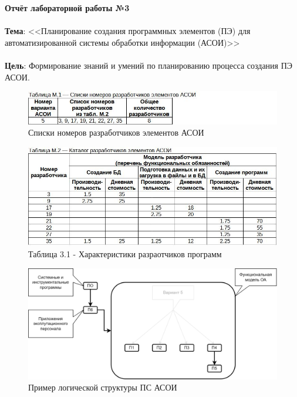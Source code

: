 \documentclass[12pt, a4paper, simple]{eskdtext}
\def \gpiDocNum {3}
\def \gpiTopicRep {Планирование создания программных элементов (ПЭ) для
автоматизированной системы обработки информации (АСОИ)}
\def \gpiDocTopic {Отчёт лабораторной работы №\gpiDocNum}
\begin{document}
    
    \thispagestyle{plain}
    \pagestyle{plain}

    \begin{center}
        \textbf{\gpiDocTopic}
    \end{center}

    \paragraph{} \textbf{Тема}: <<\gpiTopicRep>>

    \paragraph{} \textbf{Цель}:
    Формирование знаний и умений по планированию процесса создания ПЭ АСОИ.

    \begin{figure}[ph!]
        \centering
        \includegraphics[]
            {_docs/ТаблицаМ1СпискиНомеровРазработчиковЭлементовАСОИ.jpg}
        \caption{Списки номеров разработчиков элементов АСОИ}
    \end{figure}

    \begin{figure}[ph!]
        \centering
        \includegraphics[width=16cm]
            {_docs/ТаблицаМ2КаталогРазработчиковЭлементовАСОИ.jpg}
        \caption{Таблица 3.1 - Характеристики разраотчиков программ}
    \end{figure}

    \begin{figure}[ph!]
        \centering
        \includegraphics[width=16cm]
            {_docs/Рисунок3-1ПримерЛогическойСтруктурыПСАСОИ.png}
        \caption{Пример логической структуры ПС АСОИ}
    \end{figure}
\end{document}
